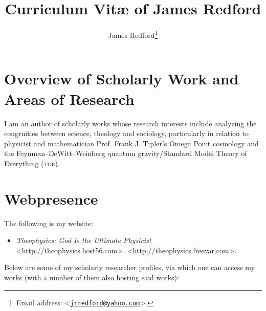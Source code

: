 \documentclass[letterpaper,12pt]{article}
\title{Curriculum Vit{\ae} of James Redford}
\author{James Redford\footnote{Email address: \textless\href{mailto:jrredford@yahoo.com}{\nolinkurl{jrredford@yahoo.com}}\textgreater .}}
\begin{document}
\maketitle

\section{Overview of Scholarly Work and Areas of Research}
\label{sec:OverviewOfScholarlyWorkAndAreasOfResearch}

I am an author of scholarly works whose research interests include analyzing the congruities between science, theology and sociology, particularly in relation to physicist and mathematician Prof. Frank J. Tipler's Omega Point cosmology and the Feynman--DeWitt--Weinberg quantum gravity\slash Standard Model Theory of Everything (\textsc{toe}).

\section{Webpresence}
\label{sec:Webpresence}

The following is my website:

\begin{itemize}
\small
\item \emph{Theophysics: God Is the Ultimate Physicist} \textless\url{http://theophysics.host56.com}\textgreater , \textless\url{http://theophysics.freevar.com}\textgreater .
\end{itemize}

Below are some of my scholarly researcher profiles, via which one can access my works (with a number of them also hosting said works):
\end{document}

